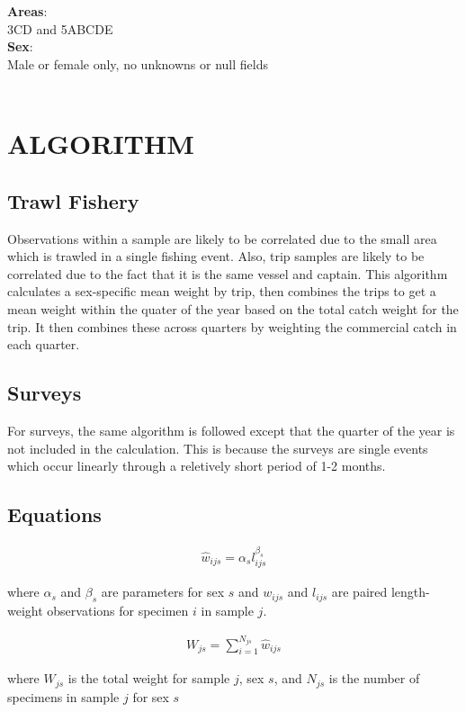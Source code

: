 \textbf{Areas}: \\
3CD and 5ABCDE
\mbox{ }\\

\textbf{Sex}: \\
Male or female only, no unknowns or null fields \\
\mbox{ }\\

\section{ALGORITHM}

\subsection{Trawl Fishery}
Observations within a sample are likely to be correlated due to the small area which is trawled in a single fishing event. Also, trip samples
are likely to be correlated due to the fact that it is the same vessel and captain. This algorithm calculates a sex-specific mean weight by
trip, then combines the trips to get a mean weight within the quater of the year based on the total catch weight for the trip. It then combines
these across quarters by weighting the commercial catch in each quarter.

\subsection{Surveys}
For surveys, the same algorithm is followed except that the quarter of the year is not included in the calculation. This is because the surveys are
single events which occur linearly through a reletively short period of 1-2 months.

\subsection{Equations}

\begin{align} \label{eq:lw}
\hat{w}_{ijs}=\alpha_sl_{ijs}^{\beta_s}
\end{align}
\begin{addmargin}[3em]{1em}
where $\alpha_s$ and $\beta_s$ are parameters for sex $s$ and $w_{ijs}$ and $l_{ijs}$ are paired length-weight observations for specimen $i$ in sample $j$.
\end{addmargin}

\begin{align} \label{eq:samplewt}
W_{js}=\sum_{i=1}^{N_{js}}\hat{w}_{ijs}
\end{align}
\begin{addmargin}[3em]{1em}
where $W_{js}$ is the total weight for sample $j$, sex $s$, and $N_{js}$ is the number of specimens in sample $j$ for sex $s$
\end{addmargin}

